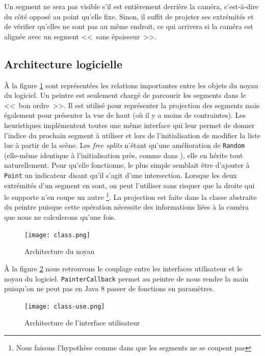 \documentclass[12pt,twocolumn]{article}
\begin{document}
Un segment ne sera pas visible s'il est entièrement derrière la caméra,
c'est-à-dire du côté opposé au point qu'elle fixe. Sinon, il suffit de projeter
ses extrémités et de vérifier qu'elles ne sont pas au même endroit, ce qui
arrivera si la caméra est alignée avec un segment <<~sans épaisseur~>>.


\subsection{Architecture logicielle}
À la figure \ref{fig:core} sont représentées les relations importantes
entre les objets du noyau du logiciel. Un peintre est seulement chargé
de parcourir les segments dans le <<~bon ordre~>>. Il est utilisé pour
représenter la projection des segments mais également pour présenter la vue de
haut (où il y a moins de contraintes). Les heuristiques implémentent toutes une
même interface qui leur permet de donner l'indice du prochain segment à utiliser
et lors de l'initialisation de modifier la liste lue à partir de la scène.
Les \textit{free splits} n'étant qu'une amélioration de \texttt{Random}
(elle-même identique à l'initialisation près, comme dans \cite[p.~256]{cg}),
elle en hérite tout naturellement. Pour qu'elle fonctionne, le plus simple
semblait être
d'ajouter à \texttt{Point} un indicateur disant qu'il s'agit d'une intersection.
Lorsque les deux extrémités d'un segment en sont, on peut l'utiliser sans
risquer que la droite qui le supporte n'en coupe un autre
\footnote{Nous faisons l'hypothèse comme dans \cite[p.~256]{cg}
que les segments ne se coupent pas}.
La projection est faite dans la classe abstraite du peintre puisque
cette opération nécessite des informations liées à la caméra
que nous ne calculerons qu'une fois.

\begin{figure}[h]
\center
\texttt{[image: class.png]}
\caption{Architecture du noyau}\label{fig:core}
\end{figure}

À la figure \ref{fig:ui} nous retrouvons le couplage entre les interfaces
utilisateur et le noyau du logiciel. \texttt{PainterCallback} permet au peintre
de nous rendre la main puisqu'on ne peut pas en Java 8 passer de fonctions en
paramètres.

\begin{figure}[h]
\center
\texttt{[image: class-use.png]}
\caption{Architecture de l'interface utilisateur}\label{fig:ui}
\end{figure}
\end{document}
